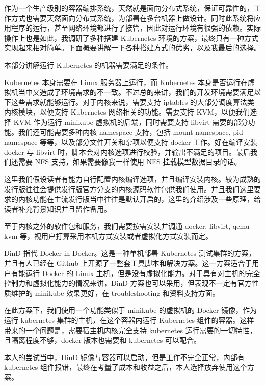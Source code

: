 作为一个生产级别的容器编排系统，天然就是面向分布式系统，保证可靠性的，工作方式也需要天然面向分布式系统，为部署在多台机器上做设计。同时此系统将应用程序的运行，甚至网络环境都进行了接管，因此对运行环境有很强的依赖。实际操作上也是如此，我调研了多种搭建 Kubernetes 环境的方案，最终只有一种方式实现起来相对简单。下面概要讲解一下各种搭建方式的优劣，以及我最后的选择。


本部分讲解运行 Kubernetes 的机器需要满足的条件。

Kubernetes 本身需要在 Linux 服务器上运行，而 Kubernetes 本身是否运行在虚拟机当中又造成了环境需求的不一致。不过总的来讲，我们的开发环境需要满足以下这些需求就能够运行。对于内核来说，需要支持 iptables 的大部分调度算法类内核模块，以便支持 Kubernetes 网络相关的功能。需要支持 KVM，以便我们选择 KVM 作为运行 minikube 虚拟机的后端，同时需要支持 libvirt 需要的部分功能。我们还可能需要多种内核 namespace 支持，包括 mount namespace, pid namespace 等等，以及部分文件开关和杂项以便支持 docker 工作。好在编译安装 docker 与 libvirt 时，脚本会对内核选项进行校验，并输出不满足的项目。最后我们还需要 NFS 支持，如果需要像我一样使用 NFS 挂载模型数据目录的话。

这里我们假设读者有能力自行配置内核编译选项，并且编译安装内核。较为成熟的发行版往往会提供发行版官方分支的内核源码软件包供我们使用。并且我们这里要求的内核功能在主流发行版当中往往是默认开启的，这里的介绍涉及一些原理，给读者补充背景知识并且留作备用。

至于内核之外的软件包和服务，我们需要按需安装并调通 docker, libvirt, qemu-kvm 等，视用户打算采用本机方式安装或者虚拟化方式安装而定。


DinD 指代 Docker in Docker。这是一种单机部署 Kubernetes 测试集群的方案，并且有人已经在 Github 上开源了一整套工具脚本和解决方案。这一方案适合于用户有能运行 Docker 的 Linux 主机，但是没有虚拟化能力。对于具有对主机的完全控制力和虚拟化能力的情况来讲，DinD 方案也可以采用，但表现不一定有官方性质维护的 minikube 效果更好，在 troubleshooting 和资料支持方面。

在此方案下，我们使用一个功能类似于 minikube 的虚拟机的 Docker 镜像，作为运行 kubernetes 集群的主机，在这个容器内运行 Kubernetes 组件的容器。这样带来的一个问题是，需要宿主机内核完全支持 kubernetes 运行需要的一切特性，且隔离程度不够，docker 版本也需要和 kubernetes 可以配合。

本人的尝试当中，DinD 镜像与容器可以启动，但是工作不完全正常，内部有 kubernetes 组件报错，最终在考量了成本和收益之后，本人选择放弃使用这个方案。

